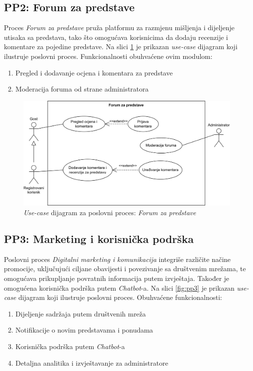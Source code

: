 \pagebreak
\subsection{PP2: Forum za predstave}

Proces \textit{Forum za predstave} pruža platformu za razmjenu mišljenja i dijeljenje utisaka sa predstava, tako što omogućava korisnicima da dodaju recenzije i komentare za pojedine predstave. Na slici \ref{fig:pp2} je prikazan \textit{use-case} dijagram koji ilustruje poslovni proces. Funkcionalnosti obuhvaćene ovim modulom:

\begin{enumerate}
    \item Pregled i dodavanje ocjena i komentara za predstave 
    \item Moderacija foruma od strane administratora
\end{enumerate}

\begin{figure}[!htb]
    \centering
    \includegraphics[width=0.8\linewidth]{Slike/Poslovni procesi/PP2.drawio.png}
    \caption{\textit{Use-case} dijagram za poslovni proces: \textit{Forum za predstave}}
    \label{fig:pp2}
\end{figure}

\subsection{PP3: Marketing i korisnička podrška}

Poslovni proces \textit{Digitalni marketing i komunikacija} integriše različite načine promocije, uključujući ciljane obavijesti i povezivanje sa društvenim mrežama, te omogućava prikupljanje povratnih informacija putem izvještaja. Također je omogućena korisnička podrška putem \textit{Chatbot}-a. Na slici \ref{fig:pp3} je prikazan \textit{use-case} dijagram koji ilustruje poslovni proces. Obuhvaćene funkcionalnosti:

\begin{enumerate}
    \item Dijeljenje sadržaja putem društvenih mreža
    \item Notifikacije o novim predstavama i ponudama
    \item Korisnička podrška putem \textit{Chatbot}-a
    \item Detaljna analitika i izvještavanje za administratore
\end{enumerate}

